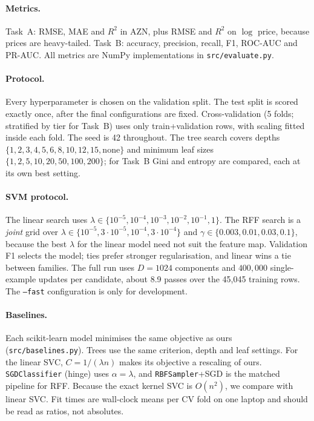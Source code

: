 \documentclass[10pt,twocolumn,a4paper]{article}
\begin{document}
\paragraph{Metrics.} Task~A: RMSE, MAE and $R^2$ in AZN, plus RMSE and $R^2$
on $\log$ price, because prices are heavy-tailed. Task~B: accuracy,
precision, recall, F1, ROC-AUC and PR-AUC. All metrics are NumPy
implementations in \texttt{src/evaluate.py}.

\paragraph{Protocol.} Every hyperparameter is chosen on the validation split.
The test split is scored exactly once, after the final configurations are
fixed. Cross-validation (5 folds; stratified by tier for Task~B) uses only
train+validation rows, with scaling fitted inside each fold. The seed is 42
throughout. The tree search covers depths
$\{1,2,3,4,5,6,8,10,12,15,\text{none}\}$ and minimum leaf sizes
$\{1,2,5,10,20,50,100,200\}$; for Task~B Gini and entropy are compared, each
at its own best setting.

\paragraph{SVM protocol.}
The linear search uses
$\lambda\in\{10^{-5},10^{-4},10^{-3},10^{-2},10^{-1},1\}$. The RFF search is
a \emph{joint} grid over
$\lambda\in\{10^{-5},3\cdot10^{-5},10^{-4},3\cdot10^{-4}\}$ and
$\gamma\in\{0.003,0.01,0.03,0.1\}$, because the best $\lambda$ for the linear
model need not suit the feature map. Validation F1 selects the model; ties
prefer stronger regularisation, and linear wins a tie between families. The
full run uses $D=1024$ components and $400{,}000$ single-example updates per
candidate, about 8.9 passes over the 45,045 training rows. The
\texttt{--fast} configuration is only for development.

\paragraph{Baselines.} Each scikit-learn model minimises the same objective as
ours (\texttt{src/baselines.py}). Trees use the same criterion, depth and leaf
settings. For the linear SVC, $C=1/(\lambda n)$ makes its objective a
rescaling of ours. \texttt{SGDClassifier} (hinge) uses $\alpha=\lambda$, and
\texttt{RBFSampler}+SGD is the matched pipeline for RFF. Because the exact
kernel SVC is $O(n^2)$, we compare with linear SVC. Fit times are wall-clock
means per CV fold on one laptop and should be read as ratios, not absolutes.
\end{document}
